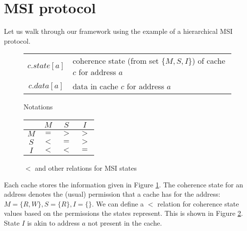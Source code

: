 \section{MSI protocol}
\label{sec:msi}

\newcommand{\printall}[5]{\text{$#1 \langle #2 \rightarrow #3, #4, #5 \rangle$}}
\newcommand{\Req}[4]{\printall{Req}{#1}{#2}{#3}{#4}}
\newcommand{\Resp}[4]{\printall{Resp}{#1}{#2}{#3}{#4}}
\newcommand{\Data}[5]{\printall{Data}{#1}{#2}{#3}{#4}{#5}}

\newcommand{\lett}{\textbf{let}}
\newcommand{\send}{\textbf{send}}
\newcommand{\receive}{\textbf{receive}}
\newcommand{\pop}{\textbf{pop}}
\newcommand{\remove}{\textbf{remove}}
\newcommand{\assert}{\textbf{assert}}
\newcommand{\call}{\textbf{call}}
\newcommand{\dReq}{\textsc{handleDownReq}}
\newcommand{\uReq}{\textsc{handleUpReq}}
\newcommand{\dReqL}{\textsc{sendDownReq}}
\newcommand{\uReqL}{\textsc{sendUpReq}}
\newcommand{\dResp}{\textsc{sendDownResp}}
\newcommand{\uResp}{\textsc{sendUpResp}}

Let us walk through our framework using the example of a hierarchical MSI
protocol.

\begin{figure}
\begin{tabularx}{\linewidth}{|cX|}
\hline
$c.state[a]$ & coherence state (from set $\{M, S, I\}$) of cache $c$ for address $a$\\
$c.data[a]$ & data in cache $c$ for address $a$\\
\hline
\end{tabularx}
\caption{Notations}
\label{table:lineinfo}
\end{figure}

\begin{wrapfigure}{r}{.4\linewidth}
\centering
\begin{tabular}{|c|ccc|}
\hline
& $M$ & $S$ & $I$\\
\hline
$M$ & $=$ & $>$ & $>$\\
$S$ & $<$ & $=$ & $>$\\
$I$ & $<$ & $<$ & $=$\\
\hline
\end{tabular}
\caption{$<$ and other relations for MSI states}
\label{msi<}
\end{wrapfigure}

Each cache stores the information given in Figure \ref{table:lineinfo}. The
coherence state for an address denotes the (usual) permission that a cache has
for the address: $M = \{R, W\}, S = \{R\}, I = \{\}$. We can define a $<$
relation for coherence state values based on the permissions the states
represent. This is shown in Figure \ref{msi<}. State $I$ is akin to address $a$
not present in the cache.

